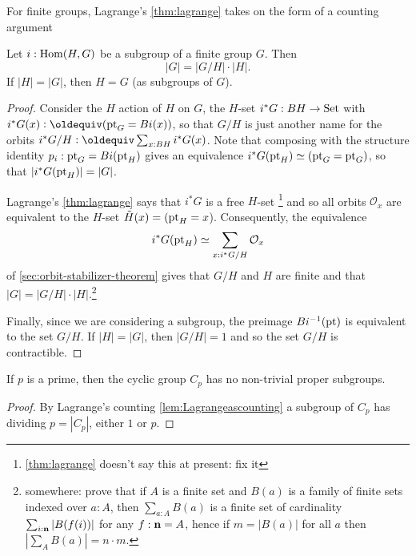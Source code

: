 For finite groups, Lagrange's \cref{thm:lagrange} takes on the form of a counting argument
\begin{lemma}
  \label{lem:Lagrangeascounting}
  Let $i:\mathrm{Hom}(H,G)$ be a subgroup of a finite group $G$.  Then 
$$|G|=|G/H|\cdot|H|.$$
If $|H|=|G|$, then $H=G$ (as subgroups of $G$).
\end{lemma}
\begin{proof}
  Consider the $H$ action of $H$ on $G$, \ie the $H$-set $i^*G:BH\to\mathord{\mathrm{Set}}$ with $i^*G(x)\defequi(\pt_G=Bi(x))$, so that $G/H$ is just another name for the orbits $i^*G/H\defequi \sum_{x:BH}i^*G(x)$.  Note that composing with the structure identity $p_i:{\mathord{\mathrm{pt}}}_G=Bi({\mathord{\mathrm{pt}}}_H)$ gives an equivalence $i^*G({\mathord{\mathrm{pt}}}_H)\simeq ({\mathord{\mathrm{pt}}}_G={\mathord{\mathrm{pt}}}_G)$, so that $|i^*G({\mathord{\mathrm{pt}}}_H)|= |G|$.

  Lagrange's \cref{thm:lagrange} says that $i^*G$ is a free $H$-set \footnote{\cref{thm:lagrange} doesn't say this at present: fix it} and so all orbits $\mathcal O_x$ are equivalent to the $H$-set $\tilde H(x)=({\mathord{\mathrm{pt}}}_H=x$).
Consequently, the equivalence 
$$i^*G({\mathord{\mathrm{pt}}}_H)\simeq\sum_{x:i^*G/H}\mathcal O_x$$ 
of \cref{sec:orbit-stabilizer-theorem} gives that $G/H$ and $H$ are finite and that $|G|=|G/H|\cdot|H|$.\footnote{somewhere: prove that if $A$ is a finite set and $B(a)$ is a family of finite sets indexed over $a:A$, then $\sum_{a:A}B(a)$ is a finite set of cardinality $\sum_{i:\mathbf{n}}|B(f(i))|$ for any $f:\mathbf{n}=A$, hence if $m=|B(a)|$ for all $a$ then $|\sum_AB(a)|=n\cdot m$.}


Finally, since we are considering a subgroup, the preimage $Bi^{-1}({\mathord{\mathrm{pt}}})$ is equivalent to the set $G/H$.  If $|H|=|G|$, then $|G/H|=1$ and so the set $G/H$ is contractible.\end{proof}


    \begin{corollary}
      \label{cor:cyclicgroupsaresimple}
      If $p$ is a prime, then  the cyclic group $C_p$ has no non-trivial proper subgroups.
    \end{corollary}
    \begin{proof}
      By Lagrange's counting \cref{lem:Lagrangeascounting} a subgroup of $C_p$ has \gporder dividing $p=|C_p|$, \ie either $1$ or $p$.
    \end{proof}

